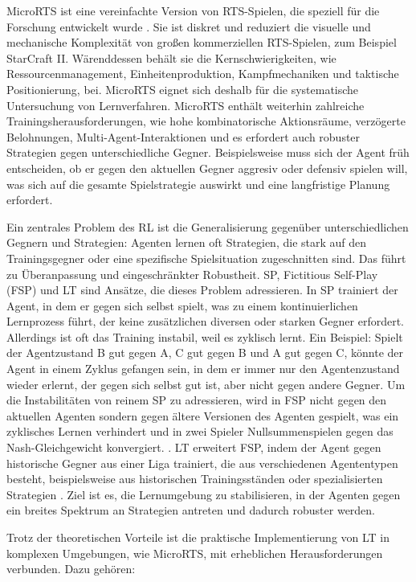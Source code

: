 \documentclass[10pt,twocolumn,letterpaper]{article}
\begin{document}
MicroRTS ist eine vereinfachte Version von RTS-Spielen, die speziell für die Forschung entwickelt wurde \cite{huang2021gym}. Sie ist diskret und reduziert die visuelle und mechanische Komplexität von großen kommerziellen RTS-Spielen, zum Beispiel StarCraft II. Wärenddessen behält sie die Kernschwierigkeiten, wie Ressourcenmanagement, Einheitenproduktion, Kampfmechaniken und taktische Positionierung, bei. MicroRTS eignet sich deshalb für die systematische Untersuchung von Lernverfahren. MicroRTS enthält weiterhin zahlreiche Trainingsherausforderungen, wie hohe kombinatorische Aktionsräume, verzögerte Belohnungen, Multi-Agent-Interaktionen und es erfordert auch robuster Strategien gegen unterschiedliche Gegner. Beispielsweise muss sich der Agent früh entscheiden, ob er gegen den aktuellen Gegner aggresiv oder defensiv spielen will, was sich auf die gesamte Spielstrategie auswirkt und eine langfristige Planung erfordert.

Ein zentrales Problem des RL ist die Generalisierung gegenüber unterschiedlichen Gegnern und Strategien: Agenten lernen oft Strategien, die stark auf den Trainingsgegner oder eine spezifische Spielsituation zugeschnitten sind. Das führt zu Überanpassung und eingeschränkter Robustheit. SP, Fictitious Self-Play (FSP) und LT sind Ansätze, die dieses Problem adressieren. In SP trainiert der Agent, in dem er gegen sich selbst spielt, was zu einem kontinuierlichen Lernprozess führt, der keine zusätzlichen diversen oder starken Gegner erfordert. Allerdings ist oft das Training instabil, weil es zyklisch lernt. Ein Beispiel: Spielt der Agentzustand B gut gegen A, C gut gegen B und A gut gegen C, könnte der Agent in einem Zyklus gefangen sein, in dem er immer nur den Agentenzustand wieder erlernt, der gegen sich selbst gut ist, aber nicht gegen andere Gegner.
Um die Instabilitäten von reinem SP zu adressieren, wird in FSP nicht gegen den aktuellen Agenten sondern gegen ältere Versionen des Agenten gespielt, was ein zyklisches Lernen verhindert und in zwei Spieler Nullsummenspielen gegen das Nash-Gleichgewicht konvergiert. \cite{heinrich2015fsp}. LT erweitert FSP, indem der Agent gegen historische Gegner aus einer Liga trainiert, die aus verschiedenen Agententypen besteht, beispielsweise aus historischen Trainingsständen oder spezialisierten Strategien \cite{vinyals2019alphastar}. Ziel ist es, die Lernumgebung zu stabilisieren, in der Agenten gegen ein breites Spektrum an Strategien antreten und dadurch robuster werden.

Trotz der theoretischen Vorteile ist die praktische Implementierung von LT in komplexen Umgebungen, wie MicroRTS, mit erheblichen Herausforderungen verbunden. Dazu gehören:
\end{document}

